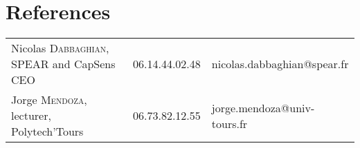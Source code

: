 \documentclass[11pt,a4paper]{moderncv}
\begin{document}
\section{References}
\begin{tabular}{ p{}
                 p{}
                 p{} }
  \hspace{0.7em} Nicolas \textsc{Dabbaghian}, \scriptsize{SPEAR and CapSens CEO} & 06.14.44.02.48 & nicolas.dabbaghian@spear.fr \\
  \hspace{0.7em} Jorge \textsc{Mendoza}, \scriptsize{lecturer, Polytech'Tours} & 06.73.82.12.55 & jorge.mendoza@univ-tours.fr \\
\end{tabular}
\end{document}
